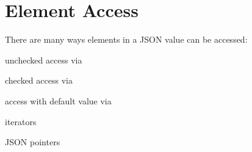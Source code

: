 \chapter{Element Access }
\hypertarget{md_include_2nlohman_2json-develop_2docs_2mkdocs_2docs_2features_2element__access_2index}{}\label{md_include_2nlohman_2json-develop_2docs_2mkdocs_2docs_2features_2element__access_2index}
\label{md_include_2nlohman_2json-develop_2docs_2mkdocs_2docs_2features_2element__access_2index_autotoc_md1437}%
%


There are many ways elements in a JSON value can be accessed:\+


\begin{DoxyItemize}
\item unchecked access via 
\item checked access via 
\item access with default value via 
\item iterators
\item JSON pointers 
\end{DoxyItemize}